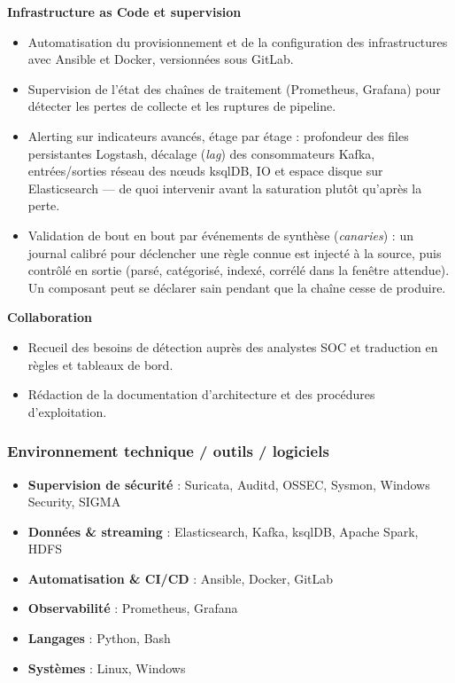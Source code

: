 \documentclass[11pt,a4paper]{article}
\begin{document}
\textbf{Infrastructure as Code et supervision}
\begin{itemize}
  \item Automatisation du provisionnement et de la configuration des infrastructures avec Ansible et Docker, versionnées sous GitLab.
  \item Supervision de l'état des chaînes de traitement (Prometheus, Grafana) pour détecter les pertes de collecte et les ruptures de pipeline.
  \item Alerting sur indicateurs avancés, étage par étage : profondeur des files persistantes Logstash, décalage (\emph{lag}) des consommateurs Kafka, entrées/sorties réseau des nœuds ksqlDB, IO et espace disque sur Elasticsearch --- de quoi intervenir avant la saturation plutôt qu'après la perte.
  \item Validation de bout en bout par événements de synthèse (\emph{canaries}) : un journal calibré pour déclencher une règle connue est injecté à la source, puis contrôlé en sortie (parsé, catégorisé, indexé, corrélé dans la fenêtre attendue). Un composant peut se déclarer sain pendant que la chaîne cesse de produire.
\end{itemize}

\textbf{Collaboration}
\begin{itemize}
  \item Recueil des besoins de détection auprès des analystes SOC et traduction en règles et tableaux de bord.
  \item Rédaction de la documentation d'architecture et des procédures d'exploitation.
\end{itemize}

\subsubsection{Environnement technique / outils / logiciels}

\begin{itemize}
  \item \textbf{Supervision de sécurité} : Suricata, Auditd, OSSEC, Sysmon, Windows Security, SIGMA
  \item \textbf{Données \& streaming} : Elasticsearch, Kafka, ksqlDB, Apache Spark, HDFS
  \item \textbf{Automatisation \& CI/CD} : Ansible, Docker, GitLab
  \item \textbf{Observabilité} : Prometheus, Grafana
  \item \textbf{Langages} : Python, Bash
  \item \textbf{Systèmes} : Linux, Windows
\end{itemize}
\end{document}
